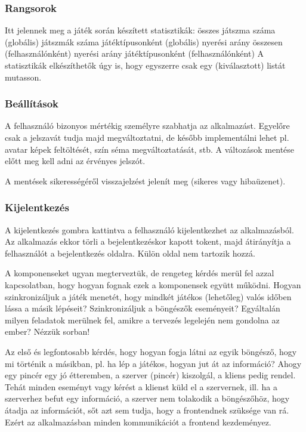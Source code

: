 \subsubsection{Rangsorok}
Itt jelennek meg a játék során készített statisztikák:
összes játszma száma (globális)
játszmák száma játéktípusonként (globális)
nyerési arány összesen (felhasználónként)
nyerési arány játéktípusonként (felhasználónként)
A statisztikák elkészíthetők úgy is, hogy egyszerre csak egy (kiválasztott) listát mutasson.

\subsubsection{Beállítások}
A felhasználó bizonyos mértékig személyre szabhatja az alkalmazást. Egyelőre csak a jelszavát tudja majd megváltoztatni, de később implementálni lehet pl. avatar képek feltöltését, szín séma megváltoztatását, stb. A változások mentése előtt meg kell adni az érvényes jelszót.

A mentések sikerességéről visszajelzést jelenít meg (sikeres vagy hibaüzenet).

\subsubsection{Kijelentkezés}
A kijelentkezés gombra kattintva a felhasználó kijelentkezhet az alkalmazásból. Az alkalmazás ekkor törli a bejelentkezéskor kapott tokent, majd átirányítja a felhasználót a bejelentkezés oldalra. Külön oldal nem tartozik hozzá.


A komponenseket ugyan megterveztük, de rengeteg kérdés merül fel azzal kapcsolatban, hogy hogyan fognak ezek a komponensek együtt működni. Hogyan szinkronizáljuk a játék menetét, hogy mindkét játékos (lehetőleg) valós időben lássa a másik lépéseit? Szinkronizáljuk a böngészők eseményeit? Egyáltalán milyen feladatok merülnek fel, amikre a tervezés legelején nem gondolna az ember? Nézzük sorban!

Az első és legfontosabb kérdés, hogy hogyan fogja látni az egyik böngésző, hogy mi történik a másikban, pl. ha lép a játékos, hogyan jut át az információ? Ahogy egy pincér egy jó étteremben, a szerver (pincér) kiszolgál, a kliens pedig rendel. Tehát minden eseményt vagy kérést a klienst küld el a szervernek, ill. ha a szerverhez befut egy információ, a szerver nem tolakodik a böngészőhöz, hogy átadja az információt, sőt azt sem tudja, hogy a frontendnek szüksége van rá. Ezért az alkalmazásban minden kommunikációt a frontend kezdeményez.

